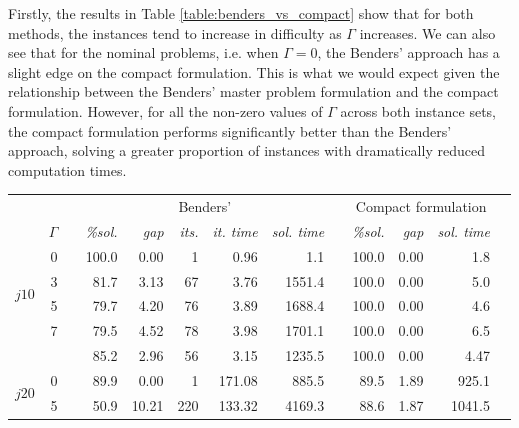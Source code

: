 \documentclass[a4paper,abstracton]{scrartcl}
\begin{document}
Firstly, the results in Table \ref{table:benders_vs_compact} show that for both methods, the instances tend to increase in difficulty as $\Gamma$ increases. We can also see that for the nominal problems, i.e. when $\Gamma=0$, the Benders' approach has a slight edge on the compact formulation. This is what we would expect given the relationship between the Benders' master problem formulation and the compact formulation. However, for all the non-zero values of $\Gamma$ across both instance sets, the compact formulation performs significantly better than the Benders' approach, solving a greater proportion of instances with dramatically reduced computation times. 

\begin{table}[h]
\centering
\small  %
{\renewcommand{\arraystretch}{1.2}  %
\begin{tabular}{lrrrrrrrrrrrr}
		     \hline \hline
		     &      & & \multicolumn{5}{c}{Benders'}                                       & & \multicolumn{3}{c}{Compact formulation} \\
		     \cline{4-8} \cline{10-12}
		     & $\Gamma$ & & \textit{\%sol.} & \textit{gap} & \textit{its.} & \textit{it. time} & \textit{sol. time} & & \textit{\%sol.}   & \textit{gap}   & \textit{sol. time}   \\
		     \hline
	\multirow{4}{*}{$j10$} & 0    & & 100.0    & 0.00     & 1            & 0.96          & 1.1	    & & 100.0      & 0.00       & 1.8             \\
			       & 3    & & 81.7     & 3.13     & 67           & 3.76          & 1551.4       & & 100.0      & 0.00       & 5.0             \\
			       & 5    & & 79.7     & 4.20     & 76           & 3.89          & 1688.4       & & 100.0      & 0.00       & 4.6             \\
			       & 7    & & 79.5     & 4.52     & 78           & 3.98          & 1701.1       & & 100.0      & 0.00       & 6.5             \\
		     \cline{4-8} \cline{10-12}
			       &      & & 85.2	   & 2.96     & 56	     & 3.15 	     & 1235.5	    & & 100.0      & 0.00	& 4.47 		  \\
		     \hline
	\multirow{4}{*}{$j20$} & 0    & & 89.9     & 0.00     & 1            & 171.08        & 885.5        & & 89.5       & 1.89       & 925.1           \\
			       & 5    & & 50.9     & 10.21    & 220          & 133.32        & 4169.3       & & 88.6       & 1.87       & 1041.5          \\

\end{tabular}}
\end{table}
\end{document}
